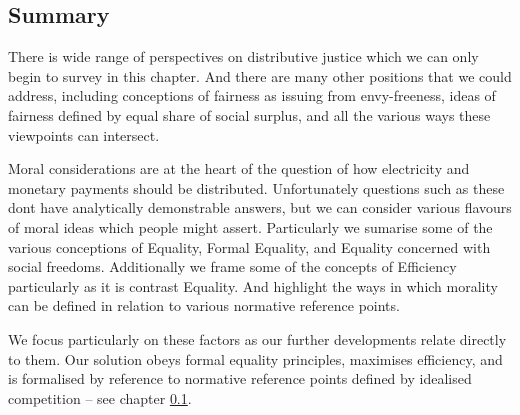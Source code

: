 \subsection{Summary}

There is wide range of perspectives on distributive justice which we can only begin to survey in this chapter.
And there are many other positions that we could address, including conceptions of fairness as issuing from envy-freeness, ideas of fairness defined by equal share of social surplus, and all the various ways these viewpoints can intersect.%

Moral considerations are at the heart of the question of how electricity and monetary payments should be distributed.
Unfortunately questions such as these dont have analytically demonstrable answers, but we can consider various flavours of moral ideas which people might assert.
Particularly we sumarise some of the various conceptions of Equality, Formal Equality, and Equality concerned with social freedoms.
Additionally we frame some of the concepts of Efficiency particularly as it is contrast Equality.
And highlight the ways in which morality can be defined in relation to various normative reference points.

We focus particularly on these factors as our further developments relate directly to them.
Our solution obeys formal equality principles, maximises efficiency, and is formalised by reference to normative reference points defined by idealised competition -- see chapter \ref{}.




